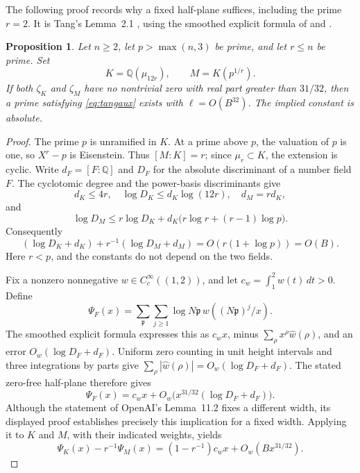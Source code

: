\documentclass[11pt]{article}
\newtheorem{proposition}[theorem]{Proposition}
\theoremstyle{definition}
\theoremstyle{remark}
\begin{document}
The following proof records why a fixed half-plane suffices, including
the prime $r=2$. It is Tang's Lemma~2.1 \cite[pp.~2--4]{Tang2026},
using the smoothed explicit formula of
\cite[Lemma~11.2, p.~45]{OpenAI2026} and
\cite[Theorem~1.1, p.~3]{CT2026}.

\begin{proposition}\label{prop:tangaux}
Let $n\geq2$, let $p>\max(n,3)$ be prime, and let $r\leq n$ be prime.
Set
\[
 K=\mathbb Q(\mu_{12r}),\qquad M=K(p^{1/r}).
\]
If both $\zeta_K$ and $\zeta_M$ have no nontrivial zero with real part
greater than $31/32$, then a prime satisfying \eqref{eq:tangaux}
exists with $\ell=O(B^{32})$. The implied constant is absolute.
\end{proposition}

\begin{proof}
The prime $p$ is unramified in $K$. At a prime above $p$, the valuation
of $p$ is one, so $X^r-p$ is Eisenstein. Thus $[M:K]=r$; since
$\mu_r\subset K$, the extension is cyclic. Write $d_F=[F:\mathbb Q]$
and $D_F$ for the absolute discriminant of a number field $F$.
The cyclotomic degree and the power-basis discriminants give
\[
 d_K\leq4r,\quad \log D_K\leq d_K\log(12r),\quad d_M=rd_K,
\]
and
\[
 \log D_M\leq r\log D_K+
 d_K\bigl(r\log r+(r-1)\log p\bigr).
\]
Consequently
\begin{equation}\label{eq:tangdisc}
 (\log D_K+d_K)+r^{-1}(\log D_M+d_M)
   =O(r(1+\log p))=O(B).
\end{equation}
Here $r<p$, and the constants do not depend on the two fields.

Fix a nonzero nonnegative $w\in C_c^\infty((1,2))$, and let
$c_w=\int_1^2w(t)\,dt>0$. Define
\[
 \Psi_F(x)=\sum_{\mathfrak p}\sum_{j\geq1}
       \log N\mathfrak p\,w((N\mathfrak p)^j/x).
\]
The smoothed explicit formula expresses this as $c_wx$, minus
$\sum_\rho x^\rho\widehat w(\rho)$, and an error
$O_w(\log D_F+d_F)$. Uniform zero counting in unit height intervals
and three integrations by parts give
$\sum_\rho|\widehat w(\rho)|=O_w(\log D_F+d_F)$.
The stated zero-free half-plane therefore gives
\[
 \Psi_F(x)=c_wx+
 O_w\bigl(x^{31/32}(\log D_F+d_F)\bigr).
\]
Although the statement of OpenAI's Lemma~11.2 fixes a different width,
its displayed proof establishes precisely this implication for a fixed
width. Applying it to $K$ and $M$, with their indicated weights, yields
\begin{equation}\label{eq:tangdifference}
 \Psi_K(x)-r^{-1}\Psi_M(x)
 =(1-r^{-1})c_wx+O_w(Bx^{31/32}).
\end{equation}


\end{proof}
\end{document}
